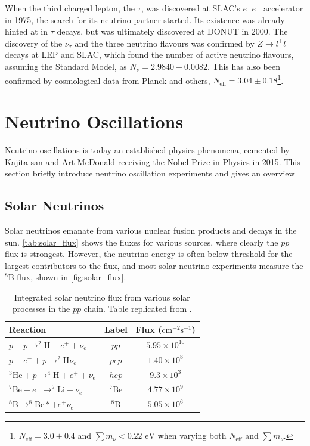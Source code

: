 When the third charged lepton, the $\tau$, was discovered at SLAC's $e^+e^-$ accelerator in 1975\cite{tau_disc}, the search for its neutrino partner started. Its existence was already hinted at in $\tau$ decays, but was ultimately discovered at DONUT\cite{tau_nu_disc} in 2000. The discovery of the $\nu_\tau$ and the three neutrino flavours was confirmed by $Z \rightarrow l^+ l^-$ decays at LEP and SLAC\cite{lep}, which found the number of active neutrino flavours, assuming the Standard Model, as $N_\nu = 2.9840\pm0.0082$. This has also been confirmed by cosmological data from Planck and others\cite{planck}, $N_\text{eff} = 3.04\pm0.18$\footnote{$N_\text{eff}=3.0\pm0.4$ and $\sum m_\nu < 0.22 \text{ eV}$ when varying both $N_\text{eff}$ and $\sum m_\nu$.}.

\section{Neutrino Oscillations}
Neutrino oscillations is today an established physics phenomena, cemented by Kajita-san and Art McDonald receiving the Nobel Prize in Physics in 2015. This section briefly introduce neutrino oscillation experiments and gives an overview

\subsection{Solar Neutrinos}
Solar neutrinos emanate from various nuclear fusion products and decays in the sun. \autoref{tab:solar_flux} shows the fluxes for various sources, where clearly the $pp$ flux is strongest. However, the neutrino energy is often below threshold for the largest contributors to the flux, and most solar neutrino experiments measure the $^{8}\text{B}$ flux, shown in \autoref{fig:solar_flux}.
\begin{table}[h]
	\begin{tabular}{l | c c}
		\hline
		\hline
		Reaction & Label & Flux ($\text{cm}^{-2} \text{s}^{-1}$) \\
		\hline
		$p+p\rightarrow ^{2}\text{H} + e^+ + \nu_e$ & $pp$ & $5.95\times10^{10}$ \\
		$p+e^-+p\rightarrow ^{2}\text{H} \nu_e$ & $pep$ & $1.40\times10^{8}$ \\
		$^{3}\text{He} + p\rightarrow ^{4}\text{H} + e^+ + \nu_e$ & $hep$ & $9.3\times10^{3}$ \\
		$^{7}\text{Be} + e^- \rightarrow ^{7}\text{Li} + \nu_e$ & $^{7}\text{Be}$ & $4.77\times10^{9}$ \\
		$^{8}\text{B} \rightarrow ^{8}\text{Be}* + e^+ \nu_e$ & $^{8}\text{B}$ & $5.05\times10^{6}$ \\
		\hline
		\hline
	\end{tabular}
	\caption{Integrated solar neutrino flux from various solar processes in the $pp$ chain. Table replicated from \cite{solar_review}.}
	\label{tab:solar_flux}
\end{table}


